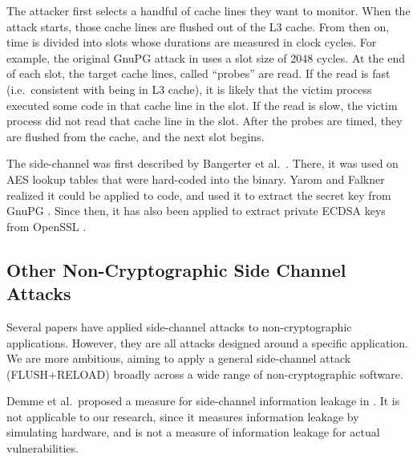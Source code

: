 \documentclass{acm_proc_article-sp}
\begin{document}
The attacker first selects a handful of cache lines they want to monitor. When
the attack starts, those cache lines are flushed out of the L3 cache. From then
on, time is divided into slots whose durations are measured in clock cycles. For
example, the original GnuPG attack in \cite{yarom2013flush} uses a slot size of
2048 cycles. At the end of each slot, the target cache lines, called ``probes''
are read. If the read is fast (i.e.\ consistent with being in L3 cache), it is
likely that the victim process executed some code in that cache line in the
slot. If the read is slow, the victim process did not read that cache line in
the slot. After the probes are timed, they are flushed from the cache, and the
next slot begins.

The side-channel was first described by Bangerter et al.\
\cite{gullasch2011cache}. There, it was used on AES lookup tables that were
hard-coded into the binary. Yarom and Falkner realized it could be applied to
code, and used it to extract the secret key from GnuPG \cite{yarom2013flush}.
Since then, it has also been applied to extract private ECDSA keys from OpenSSL
\cite{benger2014ooh}.

\subsection{Other Non-Cryptographic Side Channel Attacks}

Several papers have applied side-channel attacks to non-cryptographic
applications. However, they are all attacks designed around a specific
application. We are more ambitious, aiming to apply a general side-channel
attack (FLUSH+RELOAD) broadly across a wide range of non-cryptographic software.

Demme et al.\ proposed a measure for side-channel information leakage in
\cite{demme2012side}. It is not applicable to our research, since it measures
information leakage by simulating hardware, and is not a measure of information
leakage for actual vulnerabilities.
\end{document}
